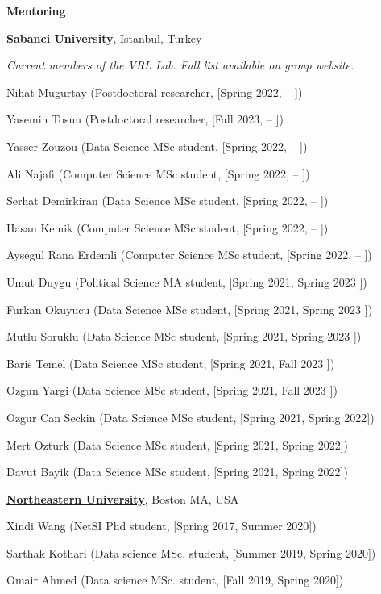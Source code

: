 \documentclass[10pt]{article}
\newenvironment{innerlist}[1][\enskip\textbullet]%
        {\begin{compactitem}[#1]}{\end{compactitem}}
\begin{document}
\vspace{3mm}
\textbf{Mentoring}
\begin{innerlist}
\item[] \href{https://www.sabanciuniv.edu/}{\textbf{Sabanci University}},
Istanbul, Turkey
\begin{innerlist}
\item[] \textit{Current members of the VRL Lab. Full list available on group website.}
\item[] Nihat Mugurtay (Postdoctoral researcher, [Spring 2022, -- ])
\item[] Yasemin Tosun (Postdoctoral researcher, [Fall 2023, -- ])
\item[] Yasser Zouzou (Data Science MSc student, [Spring 2022, -- ])
\item[] Ali Najafi (Computer Science MSc student, [Spring 2022, -- ])
\item[] Serhat Demirkiran (Data Science MSc student, [Spring 2022, -- ])
\item[] Hasan Kemik (Computer Science MSc student, [Spring 2022, -- ])
\item[] Aysegul Rana Erdemli (Computer Science MSc student, [Spring 2022, -- ])

\item[] Umut Duygu (Political Science MA student, [Spring 2021, Spring 2023 ])
\item[] Furkan Okuyucu (Data Science MSc student, [Spring 2021, Spring 2023 ])
\item[] Mutlu Soruklu (Data Science MSc student, [Spring 2021, Spring 2023 ])
\item[] Baris Temel (Data Science MSc student, [Spring 2021, Fall 2023 ])
\item[] Ozgun Yargi (Data Science MSc student, [Spring 2021, Fall 2023 ])
\item[] Ozgur Can Seckin (Data Science MSc student, [Spring 2021, Spring 2022])
\item[] Mert Ozturk (Data Science MSc student, [Spring 2021, Spring 2022])
\item[] Davut Bayik (Data Science MSc student, [Spring 2021, Spring 2022])
\end{innerlist}
\end{innerlist}


\begin{innerlist}
\item[] \href{https://www.northeastern.edu/}{\textbf{Northeastern University}},
Boston MA, USA
\begin{innerlist}
\item[] Xindi Wang (NetSI Phd student, [Spring 2017, Summer 2020])
\item[] Sarthak Kothari (Data science MSc. student, [Summer 2019, Spring 2020])
\item[] Omair Ahmed (Data science MSc. student, [Fall 2019, Spring 2020])
\end{innerlist}
\end{innerlist}
\end{document}
